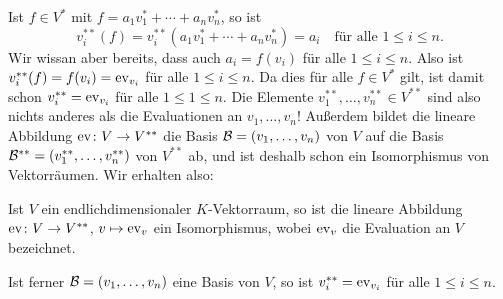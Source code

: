 \documentclass[a4paper,10pt]{article}
\begin{document}
Ist $f \in V^*$ mit $f = a_1 v_1^* + \dotsb + a_n v_n^*$, so ist
\[
 v_i^{**}(f)
 = v_i^{**}(a_1 v_1^* + \dotsb + a_n v_n^*)
 = a_i
 \quad\text{für alle $1 \leq i \leq n$}.
\]
Wir wissan aber bereits, dass auch $a_i = f(v_i)$ für alle $1 \leq i \leq n$. Also ist $v_i^{**}(f) = f(v_i) = \mathrm{ev}_{v_i}$ für alle $1 \leq i \leq n$. Da dies für alle $f \in V^*$ gilt, ist damit schon $v_i^{**} = \mathrm{ev}_{v_i}$ für alle $1 \leq 1 \leq n$. Die Elemente $v_1^{**}, \dotsc, v_n^{**} \in V^{**}$ sind also nichts anderes als die Evaluationen an $v_1, \dotsc, v_n$! Außerdem bildet die lineare Abbildung $\mathrm{ev} \colon V \to V^{**}$ die Basis $\mathcal{B} = (v_1, \dotsc, v_n)$ von $V$ auf die Basis $\mathcal{B}^{**} = (v_1^{**}, \dotsc, v_n^{**})$ von $V^{**}$ ab, und ist deshalb schon ein Isomorphismus von Vektorräumen. Wir erhalten also:

\begin{shaded}
 Ist $V$ ein endlichdimensionaler $K$-Vektorraum, so ist die lineare Abbildung \mbox{$\mathrm{ev} \colon V \to V^{**}$}, $v \mapsto \mathrm{ev}_v$ ein Isomorphismus, wobei $\mathrm{ev}_v$ die Evaluation an $V$ bezeichnet.
 
 Ist ferner $\mathcal{B} = (v_1, \dotsc, v_n)$ eine Basis von $V$, so ist $v_i^{**} = \mathrm{ev}_{v_i}$ für alle $1 \leq i \leq n$.
\end{shaded}
\end{document}
